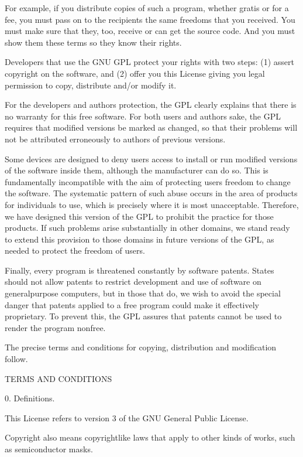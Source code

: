 \documentclass[letterpaper,10pt,english]{sphinxmanual}
\begin{document}
\begin{sphinxVerbatim}[commandchars=\\\{\}]
  For example, if you distribute copies of such a program, whether
gratis or for a fee, you must pass on to the recipients the same
freedoms that you received.  You must make sure that they, too, receive
or can get the source code.  And you must show them these terms so they
know their rights.

  Developers that use the GNU GPL protect your rights with two steps:
(1) assert copyright on the software, and (2) offer you this License
giving you legal permission to copy, distribute and/or modify it.

  For the developers\PYGZsq{} and authors\PYGZsq{} protection, the GPL clearly explains
that there is no warranty for this free software.  For both users\PYGZsq{} and
authors\PYGZsq{} sake, the GPL requires that modified versions be marked as
changed, so that their problems will not be attributed erroneously to
authors of previous versions.

  Some devices are designed to deny users access to install or run
modified versions of the software inside them, although the manufacturer
can do so.  This is fundamentally incompatible with the aim of
protecting users\PYGZsq{} freedom to change the software.  The systematic
pattern of such abuse occurs in the area of products for individuals to
use, which is precisely where it is most unacceptable.  Therefore, we
have designed this version of the GPL to prohibit the practice for those
products.  If such problems arise substantially in other domains, we
stand ready to extend this provision to those domains in future versions
of the GPL, as needed to protect the freedom of users.

  Finally, every program is threatened constantly by software patents.
States should not allow patents to restrict development and use of
software on general\PYGZhy{}purpose computers, but in those that do, we wish to
avoid the special danger that patents applied to a free program could
make it effectively proprietary.  To prevent this, the GPL assures that
patents cannot be used to render the program non\PYGZhy{}free.

  The precise terms and conditions for copying, distribution and
modification follow.

                       TERMS AND CONDITIONS

  0. Definitions.

  \PYGZdq{}This License\PYGZdq{} refers to version 3 of the GNU General Public License.

  \PYGZdq{}Copyright\PYGZdq{} also means copyright\PYGZhy{}like laws that apply to other kinds of
works, such as semiconductor masks.


\end{sphinxVerbatim}
\end{document}
